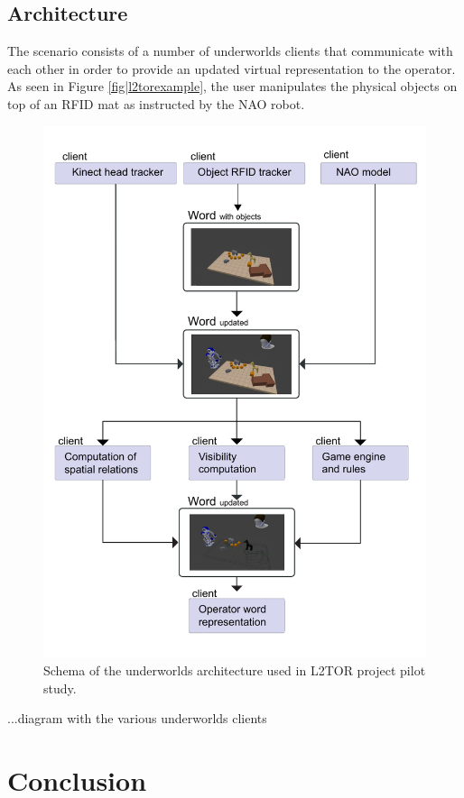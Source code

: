 \documentclass[letterpaper, 10 pt, conference]{ieeeconf}  %
\newcommand{\uwds}{{\sc underworlds}\xspace}
\begin{document}
\subsection*{Architecture}
The scenario consists of a number of \uwds clients that communicate with each other in order to provide an updated virtual representation to the operator. As seen in Figure \ref{fig|l2torexample}, the user manipulates the physical objects on top of an RFID mat as instructed by the NAO robot.     
\begin{figure}
    \centering
    \includegraphics[width=\linewidth]{l2tor-timeline}
    \caption{Schema of the \uwds architecture used in L2TOR project pilot study. }
    \label{fig|l2torarchitecture}
\end{figure}
...diagram with the various \uwds clients

\section{Conclusion}
\end{document}
